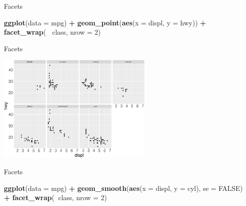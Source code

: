 \documentclass[ignorenonframetext,]{beamer}
\newenvironment{Shaded}{\begin{snugshade}}{\end{snugshade}}
\newcommand{\DataTypeTok}[1]{\textcolor[rgb]{0.13,0.29,0.53}{#1}}
\newcommand{\DecValTok}[1]{\textcolor[rgb]{0.00,0.00,0.81}{#1}}
\newcommand{\KeywordTok}[1]{\textcolor[rgb]{0.13,0.29,0.53}{\textbf{#1}}}
\newcommand{\NormalTok}[1]{#1}
\newcommand{\OperatorTok}[1]{\textcolor[rgb]{0.81,0.36,0.00}{\textbf{#1}}}
\newcommand{\OtherTok}[1]{\textcolor[rgb]{0.56,0.35,0.01}{#1}}
\newcommand{\StringTok}[1]{\textcolor[rgb]{0.31,0.60,0.02}{#1}}
\begin{document}
\begin{frame}[fragile]{Facets}
\protect\hypertarget{facets-1}{}

\begin{Shaded}
\begin{Highlighting}[]
\KeywordTok{ggplot}\NormalTok{(}\DataTypeTok{data =}\NormalTok{ mpg) }\OperatorTok{+}\StringTok{ }
\StringTok{  }\KeywordTok{geom_point}\NormalTok{(}\KeywordTok{aes}\NormalTok{(}\DataTypeTok{x =}\NormalTok{ displ, }\DataTypeTok{y =}\NormalTok{ hwy)) }\OperatorTok{+}\StringTok{ }
\StringTok{  }\KeywordTok{facet_wrap}\NormalTok{(}\OperatorTok{~}\StringTok{ }\NormalTok{class, }\DataTypeTok{nrow =} \DecValTok{2}\NormalTok{)}
\end{Highlighting}
\end{Shaded}

\end{frame}

\begin{frame}{Facets}
\protect\hypertarget{facets-2}{}

\begin{center}\includegraphics[height=200px]{data-visualization_files/figure-beamer/unnamed-chunk-71-1} \end{center}

\end{frame}

\begin{frame}[fragile]{Facets}
\protect\hypertarget{facets-3}{}

\begin{Shaded}
\begin{Highlighting}[]
\KeywordTok{ggplot}\NormalTok{(}\DataTypeTok{data =}\NormalTok{ mpg) }\OperatorTok{+}\StringTok{ }
\StringTok{  }\KeywordTok{geom_smooth}\NormalTok{(}\KeywordTok{aes}\NormalTok{(}\DataTypeTok{x =}\NormalTok{ displ, }\DataTypeTok{y =}\NormalTok{ cyl), }\DataTypeTok{se =} \OtherTok{FALSE}\NormalTok{) }\OperatorTok{+}\StringTok{ }
\StringTok{  }\KeywordTok{facet_wrap}\NormalTok{(}\OperatorTok{~}\NormalTok{class, }\DataTypeTok{nrow =} \DecValTok{2}\NormalTok{)}
\end{Highlighting}
\end{Shaded}

\end{frame}
\end{document}
